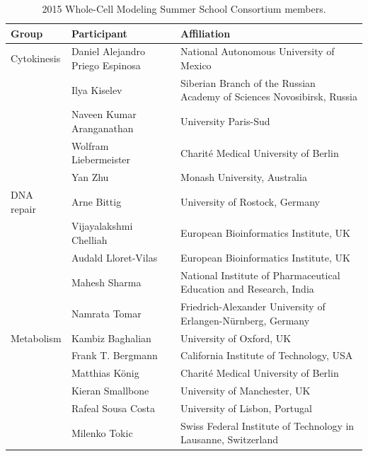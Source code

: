 \documentclass[journal,transmag]{IEEEtran}
\begin{document}
\begin{table}[ht!]
\caption{2015 Whole-Cell Modeling Summer School Consortium members.}
\begin{tabularx}{\textwidth}{l||l||X}\hline
\bfseries Group        & \bfseries Participant            & \bfseries Affiliation\\\hline\hline
Cytokinesis            & Daniel Alejandro Priego Espinosa & National Autonomous University of Mexico\\
                       & Ilya Kiselev                     & Siberian Branch of the Russian Academy of Sciences Novosibirsk, Russia\\
                       & Naveen Kumar Aranganathan        & University Paris-Sud\\
                       & Wolfram Liebermeister            & Charit\'e Medical University of Berlin\\
                       & Yan Zhu                          & Monash University, Australia\\\hline
DNA repair             & Arne Bittig                      & University of Rostock, Germany\\
                       & Vijayalakshmi Chelliah           & European Bioinformatics Institute, UK\\
                       & Audald Lloret-Vilas              & European Bioinformatics Institute, UK\\
                       & Mahesh Sharma                    & National Institute of Pharmaceutical Education and Research, India\\
                       & Namrata Tomar                    & Friedrich-Alexander University of Erlangen-N\"urnberg, Germany\\\hline
Metabolism             & Kambiz Baghalian                 & University of Oxford, UK\\
                       & Frank T. Bergmann                & California Institute of Technology, USA\\
                       & Matthias K\"onig                 & Charit\'e Medical University of Berlin\\
                       & Kieran Smallbone                 & University of Manchester, UK\\
                       & Rafeal Sousa Costa               & University of Lisbon, Portugal\\
                       & Milenko Tokic                    & Swiss Federal Institute of Technology in Lausanne, Switzerland\\\hline

\end{tabularx}
\end{table}
\end{document}
